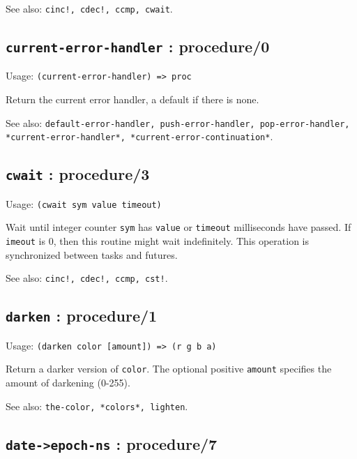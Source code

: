 \documentclass[
]{article}
\newcommand{\passthrough}[1]{#1}
\begin{document}
See also: \passthrough{\lstinline"cinc!, cdec!, ccmp, cwait"}.

\hypertarget{current-error-handler-procedure0-1}{%
\subsection{\texorpdfstring{\texttt{current-error-handler} :
procedure/0}{current-error-handler : procedure/0}}\label{current-error-handler-procedure0-1}}

Usage: \passthrough{\lstinline!(current-error-handler) => proc!}

Return the current error handler, a default if there is none.

See also:
\passthrough{\lstinline!default-error-handler, push-error-handler, pop-error-handler, *current-error-handler*, *current-error-continuation*!}.

\hypertarget{cwait-procedure3-1}{%
\subsection{\texorpdfstring{\texttt{cwait} :
procedure/3}{cwait : procedure/3}}\label{cwait-procedure3-1}}

Usage: \passthrough{\lstinline!(cwait sym value timeout)!}

Wait until integer counter \passthrough{\lstinline!sym!} has
\passthrough{\lstinline!value!} or \passthrough{\lstinline!timeout!}
milliseconds have passed. If \passthrough{\lstinline!imeout!} is 0, then
this routine might wait indefinitely. This operation is synchronized
between tasks and futures.

See also: \passthrough{\lstinline"cinc!, cdec!, ccmp, cst!"}.

\hypertarget{darken-procedure1-1}{%
\subsection{\texorpdfstring{\texttt{darken} :
procedure/1}{darken : procedure/1}}\label{darken-procedure1-1}}

Usage: \passthrough{\lstinline!(darken color [amount]) => (r g b a)!}

Return a darker version of \passthrough{\lstinline!color!}. The optional
positive \passthrough{\lstinline!amount!} specifies the amount of
darkening (0-255).

See also: \passthrough{\lstinline!the-color, *colors*, lighten!}.

\hypertarget{date-epoch-ns-procedure7-1}{%
\subsection{\texorpdfstring{\texttt{date-\textgreater{}epoch-ns} :
procedure/7}{date-\textgreater epoch-ns : procedure/7}}\label{date-epoch-ns-procedure7-1}}
\end{document}
